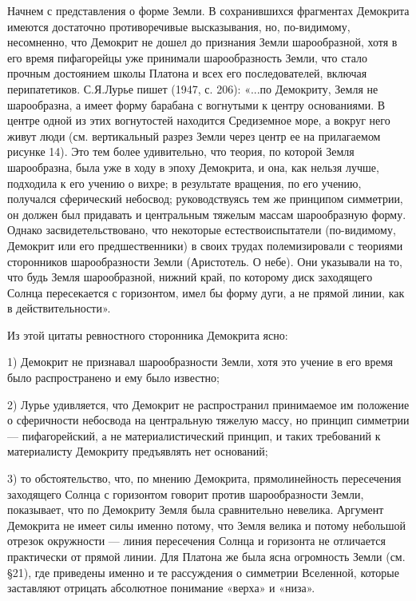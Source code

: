 Начнем  с  представления о  форме  Земли.  В сохранившихся  фрагментах
Демокрита   имеются   достаточно  противоречивые   высказывания,   но,
по-видимому,   несомненно,  что   Демокрит  не   дошел  до   признания
Земли  шарообразной,  хотя  в  его  время  пифагорейцы  уже  принимали
шарообразность  Земли,  что  стало прочным  достоянием  школы  Платона
и  всех его  последователей,  включая  перипатетиков. С.Я.Лурье  пишет
(1947,  с.  206): «...по  Демокриту,  Земля  не шарообразна,  а  имеет
форму барабана  с вогнутыми  к центру основаниями.  В центре  одной из
этих  вогнутостей  находится Средиземное  море,  а  вокруг него  живут
люди  (см. вертикальный  разрез Земли  через центр  ее на  прилагаемом
рисунке 14). Это  тем более удивительно, что теория,  по которой Земля
шарообразна, была  уже в  ходу в  эпоху Демокрита,  и она,  как нельзя
лучше,  подходила к  его учению  о  вихре; в  результате вращения,  по
его  учению, получался  сферический  небосвод;  руководствуясь тем  же
принципом  симметрии, он  должен был  придавать и  центральным тяжелым
массам шарообразную  форму. Однако засвидетельствовано,  что некоторые
естествоиспытатели (по-видимому,  Демокрит или его  предшественники) в
своих  трудах  полемизировали  с теориями  сторонников  шарообразности
Земли  (Аристотель. О  небе).  Они  указывали на  то,  что будь  Земля
шарообразной,  нижний   край,  по  которому  диск   заходящего  Солнца
пересекается с горизонтом, имел бы форму  дуги, а не прямой линии, как
в действительности».

Из этой цитаты ревностного сторонника Демокрита ясно:

1) Демокрит не  признавал шарообразности Земли, хотя это  учение в его
время было распространено и ему было известно;

2)  Лурье удивляется,  что  Демокрит не  распространил принимаемое  им
положение  о сферичности  небосвода на  центральную тяжелую  массу, но
принцип симметрии --- пифагорейский,  а не материалистический принцип,
и таких требований к материалисту Демокриту предъявлять нет оснований;

3)  то  обстоятельство,  что,  по  мнению  Демокрита,  прямолинейность
пересечения   заходящего   Солнца    с   горизонтом   говорит   против
шарообразности  Земли,   показывает,  что  по  Демокриту   Земля  была
сравнительно невелика. Аргумент Демокрита не имеет силы именно потому,
что  Земля велика  и  потому небольшой  отрезок  окружности ---  линия
пересечения  Солнца и  горизонта не  отличается практически  от прямой
линии.  Для Платона  же  была  ясна огромность  Земли  (см. §21),  где
приведены  именно  и те  рассуждения  о  симметрии Вселенной,  которые
заставляют отрицать абсолютное понимание «верха» и «низа».

